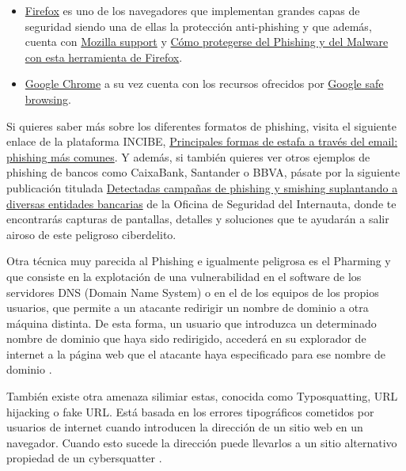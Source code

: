 \documentclass[
  a4paper,
  openany]{book}
\begin{document}
\begin{itemize}
  \begin{itemize}
  \item
    \href{https://www.mozilla.org/es-ES/firefox/}{Firefox} es uno de los navegadores que implementan grandes capas de seguridad siendo una de ellas la protección anti-phishing y que además, cuenta con \href{https://support.mozilla.org/es/}{Mozilla support} y \href{https://support.mozilla.org/es/kb/como-protegerse-del-phishing-y-del-malware-con-esta-herramienta-firefox}{Cómo protegerse del Phishing y del Malware con esta herramienta de Firefox}.
  \item
    \href{https://www.google.com/intl/es/chrome/}{Google Chrome} a su vez cuenta con los recursos ofrecidos por \href{https://safebrowsing.google.com/}{Google safe browsing}.
  \end{itemize}
\end{itemize}

Si quieres saber más sobre los diferentes formatos de phishing, visita el siguiente enlace de la plataforma INCIBE, \href{https://www.incibe.es/empresas/blog/principales-formas-de-estafa-traves-del-email-phishing-mas-comunes}{Principales formas de estafa a través del email: phishing más comunes}. Y además, si también quieres ver otros ejemplos de phishing de bancos como CaixaBank, Santander o BBVA, pásate por la siguiente publicación titulada \href{https://www.osi.es/es/actualidad/avisos/2021/06/detectadas-campanas-de-phishing-y-smishing-suplantando-diversas-entidades}{Detectadas campañas de phishing y smishing suplantando a diversas entidades bancarias} de la Oficina de Seguridad del Internauta, donde te encontrarás capturas de pantallas, detalles y soluciones que te ayudarán a salir airoso de este peligroso ciberdelito.

Otra técnica muy parecida al Phishing e igualmente peligrosa es el Pharming y que consiste en la explotación de una vulnerabilidad en el software de los servidores DNS (Domain Name System) o en el de los equipos de los propios usuarios, que permite a un atacante redirigir un nombre de dominio a otra máquina distinta. De esta forma, un usuario que introduzca un determinado nombre de dominio que haya sido redirigido, accederá en su explorador de internet a la página web que el atacante haya especificado para ese nombre de dominio \citep{KASPER-pharming}.

También existe otra amenaza silimiar estas, conocida como Typosquatting, URL hijacking o fake URL. Está basada en los errores tipográficos cometidos por usuarios de internet cuando introducen la dirección de un sitio web en un navegador. Cuando esto sucede la dirección puede llevarlos a un sitio alternativo propiedad de un cybersquatter \citep{WIKI-typosquatting}.
\end{document}
